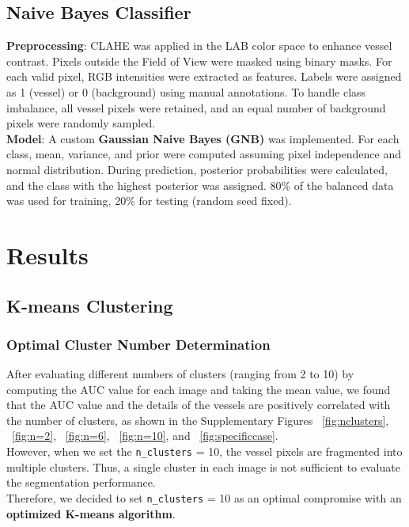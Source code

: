 \documentclass[final]{article}
\begin{document}
\subsection{Naive Bayes Classifier}
\textbf{Preprocessing}: CLAHE was applied in the LAB color space to enhance vessel contrast. Pixels outside the Field of View were masked using binary masks. For each valid pixel, RGB intensities were extracted as features. Labels were assigned as 1 (vessel) or 0 (background) using manual annotations. To handle class imbalance, all vessel pixels were retained, and an equal number of background pixels were randomly sampled. \\
\textbf{Model}: A custom \textbf{Gaussian Naive Bayes (GNB)} was implemented. For each class, mean, variance, and prior were computed assuming pixel independence and normal distribution. During prediction, posterior probabilities were calculated, and the class with the highest posterior was assigned. 80\% of the balanced data was used for training, 20\% for testing (random seed fixed).


\section{Results}
\subsection{K-means Clustering}
\subsubsection{Optimal Cluster Number Determination}
After evaluating different numbers of clusters (ranging from 2 to 10) by computing the AUC value for each image and taking the mean value, we found that the AUC value and the details of the vessels are positively correlated with the number of clusters, as shown in the Supplementary Figures ~\ref{fig:nclusters}, ~\ref{fig:n=2}, ~\ref{fig:n=6}, ~\ref{fig:n=10}, and ~\ref{fig:specificcase}. \\
However, when we set the \texttt{n\_clusters} = 10, the vessel pixels are fragmented into multiple clusters. Thus, a single cluster in each image is not sufficient to evaluate the segmentation performance. \\
Therefore, we decided to set \texttt{n\_clusters} = 10 as an optimal compromise with an \textbf{optimized K-means algorithm}.
\end{document}
